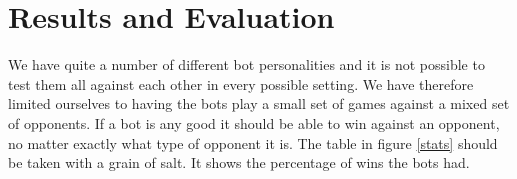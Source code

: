 \section{Results and Evaluation}



We have quite a number of different bot personalities and it is not
possible to test them all against each other in every possible
setting. We have therefore limited ourselves to having the bots play a
small set of games against a mixed set of opponents. If a bot is any
good it should be able to win against an opponent, no matter exactly
what type of opponent it is. The table in figure \ref{stats} should be
taken with a grain of salt. It shows the percentage of wins the bots
had.

